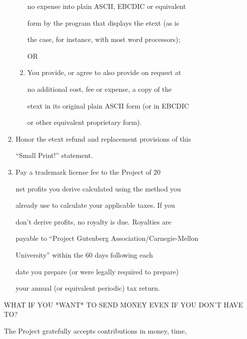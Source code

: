 \documentclass[12pt]{book}
\begin{document}
\begin{enumerate}
\begin{enumerate}
          no expense into plain ASCII, EBCDIC or equivalent

          form by the program that displays the etext (as is

          the case, for instance, with most word processors);

          OR



\item     You provide, or agree to also provide on request at

          no additional cost, fee or expense, a copy of the

          etext in its original plain ASCII form (or in EBCDIC

          or other equivalent proprietary form).

\end{enumerate}

\item  Honor the etext refund and replacement provisions of this

    ``Small Print!'' statement.



\item  Pay a trademark license fee to the Project of 20%

     net profits you derive calculated using the method you

     already use to calculate your applicable taxes.  If you

     don't derive profits, no royalty is due.  Royalties are

     payable to ``Project Gutenberg Association/Carnegie-Mellon

     University'' within the 60 days following each

     date you prepare (or were legally required to prepare)

     your annual (or equivalent periodic) tax return.

\end{enumerate}



\begin{center}

WHAT IF YOU *WANT* TO SEND MONEY EVEN IF YOU DON'T HAVE TO?

\end{center}



The Project gratefully accepts contributions in money, time,
\end{document}
